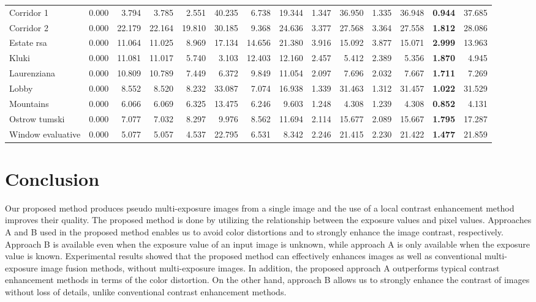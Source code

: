 \documentclass[paper]{ieice}
\begin{document}
\begin{table*}[!t]
{\begin{tabular}{l|r|rrr|rrr|rr|rr|rr}
Corridor 1 & 0.000 & 3.794 & 3.785 & 2.551 & 40.235 & 6.738 & 19.344 & 1.347 & 36.950 & 1.335 & 36.948 & \textbf{0.944} & 37.685 \\
Corridor 2 & 0.000 & 22.179 & 22.164 & 19.810 & 30.185 & 9.368 & 24.636 & 3.377 & 27.568 & 3.364 & 27.558 & \textbf{1.812} & 28.086 \\
Estate rsa & 0.000 & 11.064 & 11.025 & 8.969 & 17.134 & 14.656 & 21.380 & 3.916 & 15.092 & 3.877 & 15.071 & \textbf{2.999} & 13.963 \\
Kluki & 0.000 & 11.081 & 11.017 & 5.740 & 3.103 & 12.403 & 12.160 & 2.457 & 5.412 & 2.389 & 5.356 & \textbf{1.870} & 4.945 \\
Laurenziana & 0.000 & 10.809 & 10.789 & 7.449 & 6.372 & 9.849 & 11.054 & 2.097 & 7.696 & 2.032 & 7.667 & \textbf{1.711} & 7.269 \\
Lobby & 0.000 & 8.552 & 8.520 & 8.232 & 33.087 & 7.074 & 16.938 & 1.339 & 31.463 & 1.312 & 31.457 & \textbf{1.022} & 31.529 \\
Mountains & 0.000 & 6.066 & 6.069 & 6.325 & 13.475 & 6.246 & 9.603 & 1.248 & 4.308 & 1.239 & 4.308 & \textbf{0.852} & 4.131 \\
Ostrow tumski & 0.000 & 7.077 & 7.032 & 8.297 & 9.976 & 8.562 & 11.694 & 2.114 & 15.677 & 2.089 & 15.667 & \textbf{1.795} & 17.287 \\
Window evaluative & 0.000 & 5.077 & 5.057 & 4.537 & 22.795 & 6.531 & 8.342 & 2.246 & 21.415 & 2.230 & 21.422 & \textbf{1.477} & 21.859\\\hline
  \end{tabular}
  }
  \label{tab:CameraCIEDE}
\end{table*}
%
\section{Conclusion}
  Our proposed method produces pseudo multi-exposure images from a
  single image and the use of a local contrast enhancement method
  improves their quality.
  The proposed method is done by utilizing the relationship
  between the exposure values and pixel values.
  Approaches A and B used in the proposed method enables us to avoid color distortions
  and to strongly enhance the image contrast, respectively.
  Approach B is available even when the exposure value of an input image is unknown,
  while approach A is only available when the exposure value is known.
  Experimental results showed that the proposed method can effectively enhances images
  as well as conventional multi-exposure image fusion methods,
  without multi-exposure images.
  In addition, the proposed approach A
  outperforms typical contrast enhancement methods
  in terms of the color distortion.
  On the other hand, approach B allows us to strongly enhance
  the contrast of images without loss of details,
  unlike conventional contrast enhancement methods.
\end{document}
